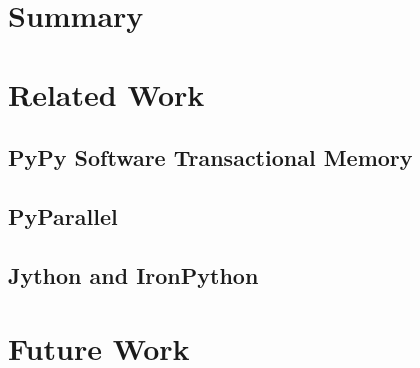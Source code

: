 \documentclass[12pt, a4paper]{report}
\begin{document}
\section{Summary}\label{sec:summary}

\section{Related Work}\label{sec:related}

\subsection{PyPy Software Transactional Memory}\label{subsec:pypy-stm}
\subsection{PyParallel}\label{subsec:pyparallel}
\subsection{Jython and IronPython}\label{subsec:other-python-impl}

\section{Future Work}\label{sec:future}

 
\end{document}
